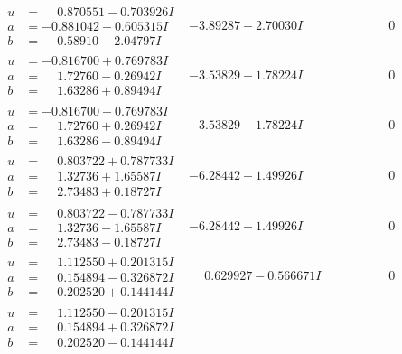 \documentclass[1p]{elsarticle_modified}
\theoremstyle{definition}
\begin{document}
$$\begin{array}{c|c|c}
\begin{aligned}
u &= \phantom{-}0.870551 - 0.703926 I \\
a &= -0.881042 - 0.605315 I \\
b &= \phantom{-}0.58910 - 2.04797 I\end{aligned}
 & -3.89287 - 2.70030 I & \phantom{-0.000000 } 0 \\ \hline\begin{aligned}
u &= -0.816700 + 0.769783 I \\
a &= \phantom{-}1.72760 - 0.26942 I \\
b &= \phantom{-}1.63286 + 0.89494 I\end{aligned}
 & -3.53829 - 1.78224 I & \phantom{-0.000000 } 0 \\ \hline\begin{aligned}
u &= -0.816700 - 0.769783 I \\
a &= \phantom{-}1.72760 + 0.26942 I \\
b &= \phantom{-}1.63286 - 0.89494 I\end{aligned}
 & -3.53829 + 1.78224 I & \phantom{-0.000000 } 0 \\ \hline\begin{aligned}
u &= \phantom{-}0.803722 + 0.787733 I \\
a &= \phantom{-}1.32736 + 1.65587 I \\
b &= \phantom{-}2.73483 + 0.18727 I\end{aligned}
 & -6.28442 + 1.49926 I & \phantom{-0.000000 } 0 \\ \hline\begin{aligned}
u &= \phantom{-}0.803722 - 0.787733 I \\
a &= \phantom{-}1.32736 - 1.65587 I \\
b &= \phantom{-}2.73483 - 0.18727 I\end{aligned}
 & -6.28442 - 1.49926 I & \phantom{-0.000000 } 0 \\ \hline\begin{aligned}
u &= \phantom{-}1.112550 + 0.201315 I \\
a &= \phantom{-}0.154894 - 0.326872 I \\
b &= \phantom{-}0.202520 + 0.144144 I\end{aligned}
 & \phantom{-}0.629927 - 0.566671 I & \phantom{-0.000000 } 0 \\ \hline\begin{aligned}
u &= \phantom{-}1.112550 - 0.201315 I \\
a &= \phantom{-}0.154894 + 0.326872 I \\
b &= \phantom{-}0.202520 - 0.144144 I\end{aligned}

\end{array}$$
\end{document}
